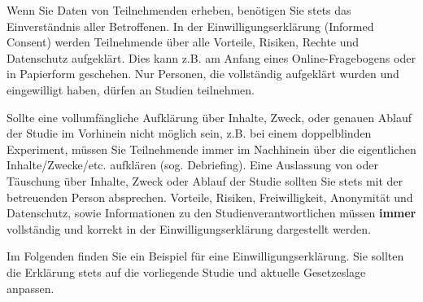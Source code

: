 \documentclass[
  letterpaper,
  DIV=11]{scrreprt}
\begin{document}
Wenn Sie Daten von Teilnehmenden erheben, benötigen Sie stets das
Einverständnis aller Betroffenen. In der Einwilligungserklärung
(Informed Consent) werden Teilnehmende über alle Vorteile, Risiken,
Rechte und Datenschutz aufgeklärt. Dies kann z.B. am Anfang eines
Online-Fragebogens oder in Papierform geschehen. Nur Personen, die
vollständig aufgeklärt wurden und eingewilligt haben, dürfen an Studien
teilnehmen.

Sollte eine vollumfängliche Aufklärung über Inhalte, Zweck, oder genauen
Ablauf der Studie im Vorhinein nicht möglich sein, z.B. bei einem
doppelblinden Experiment, müssen Sie Teilnehmende immer im Nachhinein
über die eigentlichen Inhalte/Zwecke/etc. aufklären (sog. Debriefing).
Eine Auslassung von oder Täuschung über Inhalte, Zweck oder Ablauf der
Studie sollten Sie stets mit der betreuenden Person absprechen.
Vorteile, Risiken, Freiwilligkeit, Anonymität und Datenschutz, sowie
Informationen zu den Studienverantwortlichen müssen \textbf{immer}
vollständig und korrekt in der Einwilligungserklärung dargestellt
werden.

Im Folgenden finden Sie ein Beispiel für eine Einwilligungserklärung.
Sie sollten die Erklärung stets auf die vorliegende Studie und aktuelle
Gesetzeslage anpassen.
\end{document}
